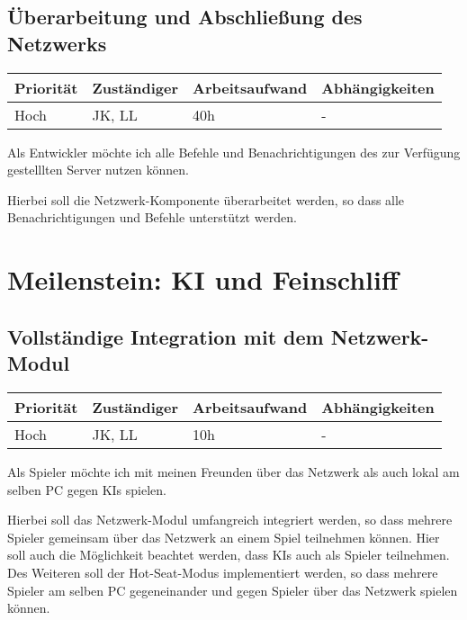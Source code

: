 \documentclass[a4paper]{scrreprt}
\newenvironment{requirement}[5] {
	\subsection{#1}
	\begin{tabularx}{\textwidth}{|X|l|X|X|}
		\hline
		Priorität & Zuständiger & Arbeitsaufwand & Abhängigkeiten \\
		\hline
		#2 & #3 & #4 & #5 \\
		\hline
	\end{tabularx}
	}{
	\newpage
	}
\begin{document}
\begin{requirement}{Überarbeitung und Abschließung des Netzwerks}{Hoch}{JK, LL}{40h}{-}

\begin{center}
	Als Entwickler möchte ich alle Befehle und Benachrichtigungen des zur Verfügung gestelllten Server nutzen können.
\end{center}

Hierbei soll die Netzwerk-Komponente überarbeitet werden, so dass alle Benachrichtigungen und Befehle unterstützt werden.

\end{requirement}


\section{Meilenstein: KI und Feinschliff}


\begin{requirement}{Vollständige Integration mit dem Netzwerk-Modul}{Hoch}{JK, LL}{10h}{-}

\begin{center}
	Als Spieler möchte ich mit meinen Freunden über das Netzwerk als auch lokal am selben PC gegen KIs spielen.
\end{center}

Hierbei soll das Netzwerk-Modul umfangreich integriert werden, so dass mehrere Spieler gemeinsam über das Netzwerk an einem Spiel teilnehmen können. Hier soll auch die Möglichkeit beachtet werden, dass KIs auch als Spieler teilnehmen. Des Weiteren soll der Hot-Seat-Modus implementiert werden, so dass mehrere Spieler am selben PC gegeneinander und gegen Spieler über das Netzwerk spielen können.

\end{requirement}
\end{document}
